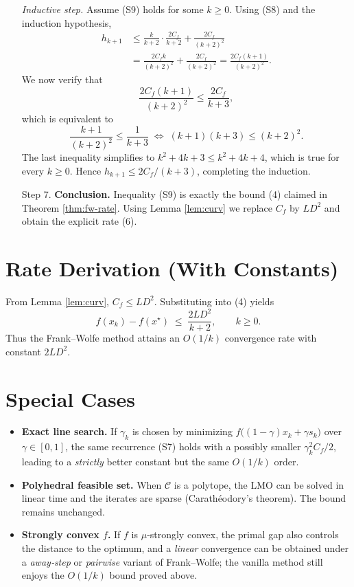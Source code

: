 \documentclass{article}
\newcommand{\Cset}{\mathcal{C}}
\newcommand{\opt}{x^{\star}}
\begin{document}
\begin{enumerate}
\emph{Inductive step.}  
Assume (S9) holds for some $k\ge0$. Using (S8) and the induction hypothesis,
\[
\begin{aligned}
h_{k+1}
&\le \frac{k}{k+2}\cdot\frac{2C_{f}}{k+2}+\frac{2C_{f}}{(k+2)^{2}}\\[4pt]
&= \frac{2C_{f}k}{(k+2)^{2}}+\frac{2C_{f}}{(k+2)^{2}}
   =\frac{2C_{f}(k+1)}{(k+2)^{2}}.
\end{aligned}
\]
We now verify that
\[
\frac{2C_{f}(k+1)}{(k+2)^{2}}\le \frac{2C_{f}}{k+3},
\]
which is equivalent to
\[
\frac{k+1}{(k+2)^{2}}\le\frac{1}{k+3}
\;\Longleftrightarrow\;
(k+1)(k+3)\le (k+2)^{2}.
\]
The last inequality simplifies to $k^{2}+4k+3\le k^{2}+4k+4$, which is true for every $k\ge0$. Hence $h_{k+1}\le 2C_{f}/(k+3)$, completing the induction.

\item[Step 7.] \textbf{Conclusion.}  
Inequality (S9) is exactly the bound (4) claimed in Theorem \ref{thm:fw-rate}.  Using Lemma \ref{lem:curv} we replace $C_{f}$ by $L D^{2}$ and obtain the explicit rate (6).
\end{enumerate}

\section*{Rate Derivation (With Constants)}
From Lemma \ref{lem:curv}, $C_{f}\le L D^{2}$. Substituting into (4) yields
\[
f(x_{k})-f(\opt)\;\le\;\frac{2L D^{2}}{k+2},
\qquad k\ge0.
\]
Thus the Frank–Wolfe method attains an $O(1/k)$ convergence rate with constant $2L D^{2}$.

\section*{Special Cases}
\begin{itemize}
\item \textbf{Exact line search.}  If $\gamma_{k}$ is chosen by minimizing $f\bigl((1-\gamma)x_{k}+\gamma s_{k}\bigr)$ over $\gamma\in[0,1]$, the same recurrence (S7) holds with a possibly smaller $\gamma_{k}^{2}C_{f}/2$, leading to a \emph{strictly} better constant but the same $O(1/k)$ order.
\item \textbf{Polyhedral feasible set.}  When $\Cset$ is a polytope, the LMO can be solved in linear time and the iterates are sparse (Carathéodory’s theorem).  The bound remains unchanged.
\item \textbf{Strongly convex $f$.}  If $f$ is $\mu$‑strongly convex, the primal gap also controls the distance to the optimum, and a \emph{linear} convergence can be obtained under a \emph{away‑step} or \emph{pairwise} variant of Frank–Wolfe; the vanilla method still enjoys the $O(1/k)$ bound proved above.
\end{itemize}
\end{document}
